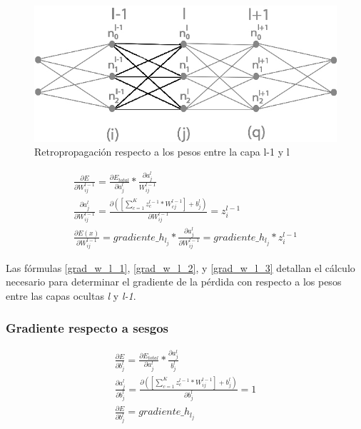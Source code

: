 \begin{figure}[H]
	\centering
	\includegraphics[scale=0.35]{imagenes/conclusion_pesos.jpg}  
	\caption{Retropropagación respecto a los pesos entre la capa l-1 y l}
	\label{fig:conclusion_pesos}
\end{figure}

\begin{gather}
	\frac{\partial E}{\partial W^{l-1}_{ij}} = \frac{\partial E_{total} }{\partial a^l_j } * \frac{\partial a^l_j}{W^{l-1}_{ij}} \label{grad_w_l_1} \\
	\frac{\partial a^l_j }{\partial W^{l-1}_{ij} } = \frac{\partial ([\sum_{c=1}^{K} z^{l-1}_c * W^{l-1}_{cj}] + b^l_j)}{\partial W^{l-1}_{ij} } = z^{l-1}_i \label{grad_w_l_2} \\
	\frac{\partial E(x) }{\partial W^{l-1}_{ij} } = gradiente\_h_{l_j} * \frac{\partial a^l_j }{\partial W^{l-1}_{ij} } = gradiente\_h_{l_j} * z^{l-1}_i \label{grad_w_l_3}
\end{gather}

Las fórmulas \ref{grad_w_l_1}, \ref{grad_w_l_2}, y \ref{grad_w_l_3} detallan el cálculo necesario para determinar el gradiente de la pérdida con respecto a los pesos entre las capas ocultas \textit{l} y \textit{l-1}.

\subsubsection{Gradiente respecto a sesgos}

\begin{gather}
	\frac{\partial E}{\partial b^l_j} = \frac{\partial E_{total} }{\partial a^l_j } * \frac{\partial a^l_j}{b^l_j} \label{grad_b_l_1} \\
	\frac{\partial a^l_j }{\partial b^l_j } = \frac{\partial ([\sum_{c=1}^{K} z^{l-1}_c * W^{l-1}_{ij}] + b^l_j) }{\partial b^l_j } = 1 \label{grad_b_l_2} \\
	\frac{\partial E}{\partial b^l_j} = gradiente\_h_{l_j} \label{grad_b_l_3}
\end{gather}

